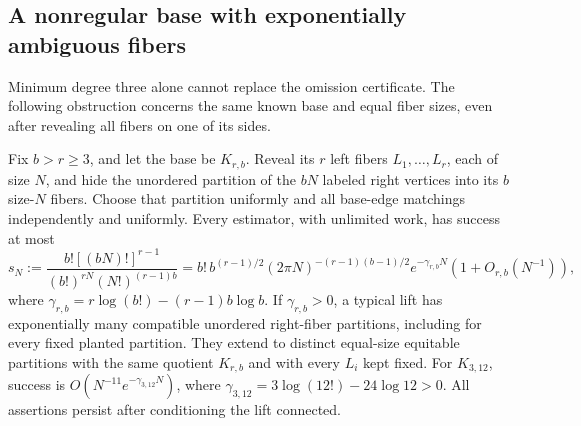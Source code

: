 \subsection{A nonregular base with exponentially ambiguous fibers}
\label{sec:nonregular-obstruction}
Minimum degree three alone cannot replace the omission certificate.
The following obstruction concerns the same known base and equal fiber
sizes, even after revealing all fibers on one of its sides.

\begin{theorem}
\label{thm:nonregular-obstruction}
Fix $b>r\ge3$, and let the base be $K_{r,b}$. Reveal its $r$ left
fibers $L_1,\ldots,L_r$, each of size $N$, and hide the unordered
partition of the $bN$ labeled right vertices into its $b$ size-$N$
fibers. Choose that partition uniformly and all base-edge matchings
independently and uniformly. Every estimator, with unlimited work,
has success at most
\begin{equation}\label{eq:nonregular-success}
 s_N:=\frac{b![(bN)!]^{r-1}}
 {(b!)^{rN}(N!)^{(r-1)b}}
 =b!\,b^{(r-1)/2}(2\pi N)^{-(r-1)(b-1)/2}
       e^{-\gamma_{r,b}N}(1+O_{r,b}(N^{-1})),
\end{equation}
where $\gamma_{r,b}=r\log(b!)-(r-1)b\log b$.
If $\gamma_{r,b}>0$, a typical lift has exponentially many compatible
unordered right-fiber partitions, including for every fixed planted
partition. They extend to distinct equal-size equitable partitions
with the same quotient $K_{r,b}$ and with every $L_i$ kept fixed.
For $K_{3,12}$, success is $O(N^{-11}e^{-\gamma_{3,12}N})$, where
$\gamma_{3,12}=3\log(12!)-24\log12>0$.
All assertions persist after conditioning the lift connected.
\end{theorem}
